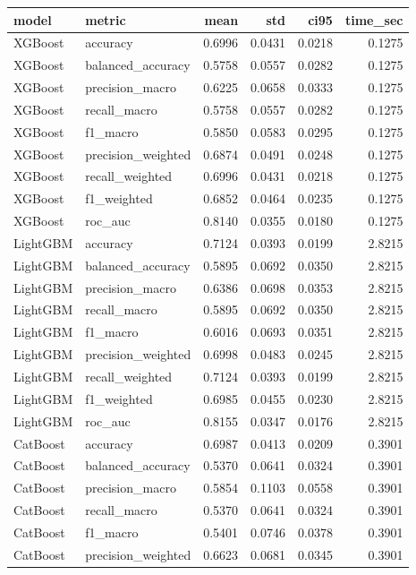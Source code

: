 \begin{tabular}{llrrrr}
\toprule
model & metric & mean & std & ci95 & time_sec \\
\midrule
XGBoost & accuracy & 0.6996 & 0.0431 & 0.0218 & 0.1275 \\
XGBoost & balanced_accuracy & 0.5758 & 0.0557 & 0.0282 & 0.1275 \\
XGBoost & precision_macro & 0.6225 & 0.0658 & 0.0333 & 0.1275 \\
XGBoost & recall_macro & 0.5758 & 0.0557 & 0.0282 & 0.1275 \\
XGBoost & f1_macro & 0.5850 & 0.0583 & 0.0295 & 0.1275 \\
XGBoost & precision_weighted & 0.6874 & 0.0491 & 0.0248 & 0.1275 \\
XGBoost & recall_weighted & 0.6996 & 0.0431 & 0.0218 & 0.1275 \\
XGBoost & f1_weighted & 0.6852 & 0.0464 & 0.0235 & 0.1275 \\
XGBoost & roc_auc & 0.8140 & 0.0355 & 0.0180 & 0.1275 \\
LightGBM & accuracy & 0.7124 & 0.0393 & 0.0199 & 2.8215 \\
LightGBM & balanced_accuracy & 0.5895 & 0.0692 & 0.0350 & 2.8215 \\
LightGBM & precision_macro & 0.6386 & 0.0698 & 0.0353 & 2.8215 \\
LightGBM & recall_macro & 0.5895 & 0.0692 & 0.0350 & 2.8215 \\
LightGBM & f1_macro & 0.6016 & 0.0693 & 0.0351 & 2.8215 \\
LightGBM & precision_weighted & 0.6998 & 0.0483 & 0.0245 & 2.8215 \\
LightGBM & recall_weighted & 0.7124 & 0.0393 & 0.0199 & 2.8215 \\
LightGBM & f1_weighted & 0.6985 & 0.0455 & 0.0230 & 2.8215 \\
LightGBM & roc_auc & 0.8155 & 0.0347 & 0.0176 & 2.8215 \\
CatBoost & accuracy & 0.6987 & 0.0413 & 0.0209 & 0.3901 \\
CatBoost & balanced_accuracy & 0.5370 & 0.0641 & 0.0324 & 0.3901 \\
CatBoost & precision_macro & 0.5854 & 0.1103 & 0.0558 & 0.3901 \\
CatBoost & recall_macro & 0.5370 & 0.0641 & 0.0324 & 0.3901 \\
CatBoost & f1_macro & 0.5401 & 0.0746 & 0.0378 & 0.3901 \\
CatBoost & precision_weighted & 0.6623 & 0.0681 & 0.0345 & 0.3901 \\

\end{tabular}
